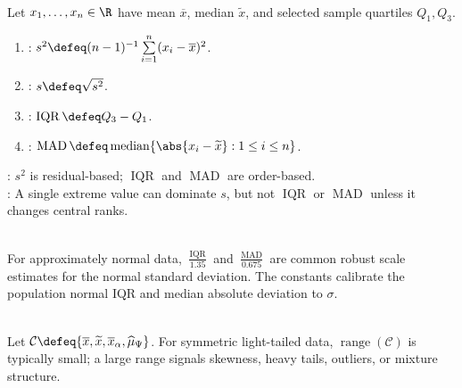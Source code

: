 \begin{definition} \label{def:dispersion-summaries-for-data} \\
Let $x_1,\ldots,x_n\in\R$ have mean $\overline{x}$, median $\widetilde{x}$, and selected sample quartiles $Q_1,Q_3$.
\begin{enumerate}[label=(\roman*)]
\setlength{\itemsep}{0pt}
\item {}: $s^2\defeq(n-1)^{-1}\sum\limits_{i=1}^n(x_i-\overline{x})^2$.
\item {}: $s\defeq\sqrt{s^2}$.
\item {}: $\operatorname{IQR}\defeq Q_3-Q_1$.
\item {}: $\operatorname{MAD}\defeq\operatorname{median}\{\abs{x_i-\widetilde{x}}:1\leq i\leq n\}$.
\end{enumerate}
: $s^2$ is residual-based; $\operatorname{IQR}$ and $\operatorname{MAD}$ are order-based.\\
: A single extreme value can dominate $s$, but not $\operatorname{IQR}$ or $\operatorname{MAD}$ unless it changes central ranks.
\end{definition}

\begin{remark} \label{rem:normal-scale-calibrations} \\
For approximately normal data, $\frac{\operatorname{IQR}}{1.35}$ and $\frac{\operatorname{MAD}}{0.675}$ are common robust scale estimates for the normal standard deviation. The constants calibrate the population normal IQR and median absolute deviation to $\sigma$.
\end{remark}

\begin{remark} \label{rem:compare-multiple-location-summaries} \\
Let $\mathcal{C}\defeq\{\overline{x},\widetilde{x},\overline{x}_\alpha,\widehat{\mu}_\Psi\}$. For symmetric light-tailed data, $\operatorname{range}(\mathcal{C})$ is typically small; a large range signals skewness, heavy tails, outliers, or mixture structure.
\end{remark}
